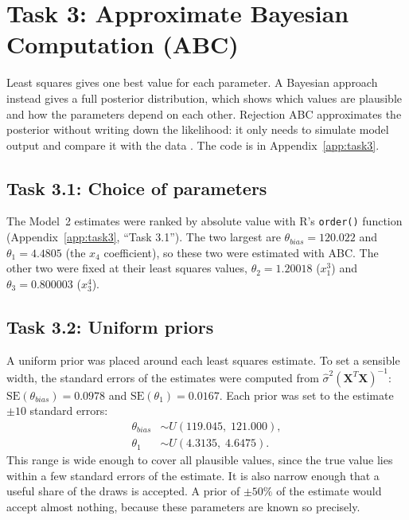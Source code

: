 \section{Task 3: Approximate Bayesian Computation (ABC)}
\label{sec:task3}

Least squares gives one best value for each parameter. A Bayesian approach instead gives a full posterior distribution, which shows which values are plausible and how the parameters depend on each other. Rejection ABC approximates the posterior without writing down the likelihood: it only needs to simulate model output and compare it with the data \citep{beaumont2002,sunnaker2013}. The code is in Appendix~\ref{app:task3}.

\subsection{Task 3.1: Choice of parameters}
The Model~2 estimates were ranked by absolute value with R's \texttt{order()} function (Appendix~\ref{app:task3}, ``Task 3.1''). The two largest are $\theta_{bias}=120.022$ and $\theta_1=4.4805$ (the $x_4$ coefficient), so these two were estimated with ABC. The other two were fixed at their least squares values, $\theta_2=1.20018$ ($x_1^3$) and $\theta_3=0.800003$ ($x_3^4$).

\subsection{Task 3.2: Uniform priors}
A uniform prior was placed around each least squares estimate. To set a sensible width, the standard errors of the estimates were computed from $\hat\sigma^2(\mathbf{X}^T\mathbf{X})^{-1}$: $\text{SE}(\theta_{bias})=0.0978$ and $\text{SE}(\theta_1)=0.0167$. Each prior was set to the estimate $\pm10$ standard errors:
\begin{align*}
\theta_{bias}&\sim U(119.045,\;121.000),\\
\theta_1&\sim U(4.3135,\;4.6475).
\end{align*}
This range is wide enough to cover all plausible values, since the true value lies within a few standard errors of the estimate. It is also narrow enough that a useful share of the draws is accepted. A prior of $\pm50\%$ of the estimate would accept almost nothing, because these parameters are known so precisely.

